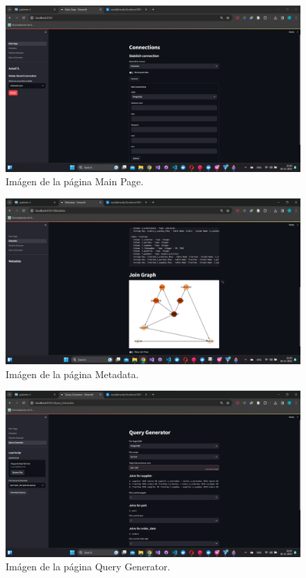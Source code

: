 \begin{annexes}
    \begin{figure}
        \centering
        \includegraphics[scale=0.4]{Graphics/mainpage.png}
        \caption{Im\'agen de la p\'agina Main Page.}
        \label{fig:mainpage}
      \end{figure}

    \begin{figure}
        \centering
        \includegraphics[scale=0.4]{Graphics/metadata.png}
        \caption{Im\'agen de la p\'agina Metadata.}
        \label{fig:meta}
    \end{figure}

    \begin{figure}
        \centering
        \includegraphics[scale=0.4]{Graphics/querygene.png}
        \caption{Im\'agen de la p\'agina Query Generator.}
        \label{fig:generator}
    \end{figure}


\end{annexes}
